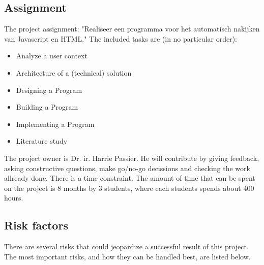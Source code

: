 \documentclass{article}
\begin{document}
\subsection{Assignment}

The project assignment: "Realiseer een programma voor het automatisch nakijken
van Javascript en HTML." The included tasks are (in no particular order):

\begin{itemize}
  \item Analyze a user context
  \item Architecture of a (technical) solution
  \item Designing a Program
  \item Building a Program
  \item Implementing a Program
  \item Literature study
\end{itemize}

The project owner is Dr. ir. Harrie Passier. He will contribute by giving
feedback, asking constructive questions, make go/no-go decissions and checking
the work allready done. There is a time constraint. The amount of time that can
be spent on the project is 8 months by 3 students, where each students spends
about 400 hours.

\subsection{Risk factors}

There are several risks that could jeopardize a successful result of this
project. The most important risks, and how they can be handled best, are listed
below.
\end{document}
